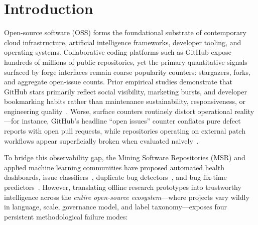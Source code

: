 \documentclass[conference]{IEEEtran}
\begin{document}
\section{Introduction}

Open-source software (OSS) forms the foundational substrate of contemporary cloud infrastructure, artificial intelligence frameworks, developer tooling, and operating systems. Collaborative coding platforms such as GitHub expose hundreds of millions of public repositories, yet the primary quantitative signals surfaced by forge interfaces remain coarse popularity counters: stargazers, forks, and aggregate open-issue counts. Prior empirical studies demonstrate that GitHub stars primarily reflect social visibility, marketing bursts, and developer bookmarking habits rather than maintenance sustainability, responsiveness, or engineering quality~\cite{borges2018github}. Worse, surface counters routinely distort operational reality---for instance, GitHub's headline ``open issues'' counter conflates pure defect reports with open pull requests, while repositories operating on external patch workflows appear superficially broken when evaluated naively~\cite{kalliamvakou2014promises}.

To bridge this observability gap, the Mining Software Repositories (MSR) and applied machine learning communities have proposed automated health dashboards, issue classifiers~\cite{kallis2019ticket}, duplicate bug detectors~\cite{deshmukh2017duplicate}, and bug fix-time predictors~\cite{giger2010predicting}. However, translating offline research prototypes into trustworthy intelligence across the \emph{entire open-source ecosystem}---where projects vary wildly in language, scale, governance model, and label taxonomy---exposes four persistent methodological failure modes:
\end{document}
